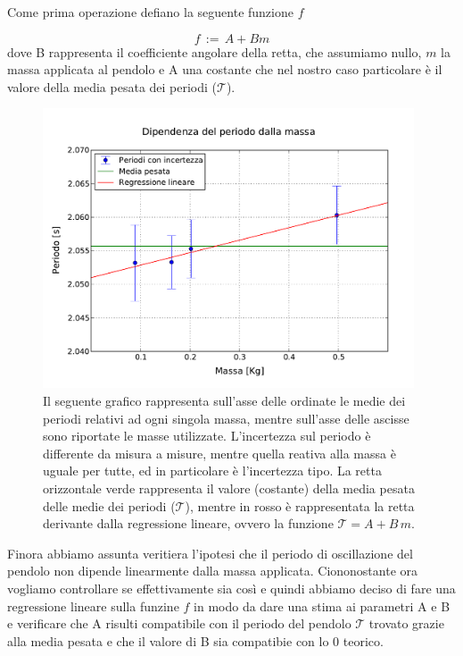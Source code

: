 Come prima operazione defiano la seguente funzione $f$

\begin{equation}
	f \,:=\, A + B m 
\end{equation}
%
dove B rappresenta il coefficiente angolare della retta, che assumiamo nullo, $m$ la massa applicata al pendolo e A una costante che nel nostro caso particolare è il valore della media pesata dei periodi ($\mathcal{T}$).\\

\begin{figure}
    \centering
    \includegraphics[width=110mm]{immagini/masse.pdf}
    \caption{Il seguente grafico rappresenta sull'asse delle ordinate le medie dei periodi relativi ad ogni
        singola massa, mentre sull'asse delle ascisse sono riportate le masse utilizzate. L'incertezza sul periodo
        è differente da misura a misure, mentre quella reativa alla massa è uguale per tutte, ed in particolare è
        l'incertezza tipo. La retta orizzontale verde rappresenta il valore (costante) della media pesata delle medie
        dei periodi ($\mathcal{T}$), mentre in rosso è rappresentata la retta derivante dalla regressione lineare,
        ovvero la funzione $\mathcal{T} = A + B\,m$.}
    \label{fig: periodo vs masse}
\end{figure}

Finora abbiamo assunta veritiera l'ipotesi che il periodo di oscillazione del pendolo non dipende linearmente dalla massa applicata. Ciononostante ora vogliamo controllare se effettivamente sia così e quindi abbiamo deciso di fare una regressione lineare sulla funzine $f$ in modo da dare una stima ai parametri A e B e verificare che A risulti compatibile con il periodo del pendolo $\mathcal{T}$ trovato grazie alla media pesata e che il valore di B sia compatibie con lo 0 teorico.\\

